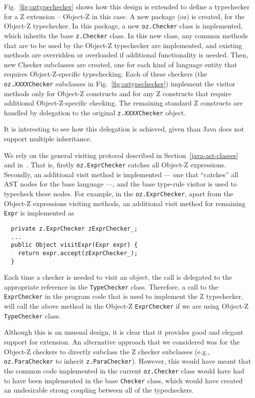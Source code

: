 \documentclass{llncs}
\begin{document}
Fig.~\ref{fig:oztypechecker} shows how this design is extended to
define a typechecker for a Z extension -- Object-Z in this case.  A
new package (oz) is created, for the Object-Z typechecker.  In this
package, a new {\tt oz.Checker} class is implemented, which inherits
the base {\tt z.Checker} class.  In this new class, any common methods
that are to be used by the Object-Z typechecker are implemented, and
existing methods are overridden or overloaded if additional
functionality is needed.  Then, new Checker subclasses are created,
one for each kind of language entity that requires Object-Z-specific
typechecking.  Each of these checkers (the
\texttt{oz.\emph{XXXX}Checker} subclasses in
Fig.~\ref{fig:oztypechecker}) implement the visitor methods only for
Object-Z constructs and for any Z constructs that require additional
Object-Z-specific checking.  The remaining standard Z constructs are
handled by delegation to the original
\texttt{z.\emph{XXXX}Checker} object.

It is interesting to see how this delegation is achieved, given than
Java does not support multiple inheritance.

We rely on the general
visiting protocol described in Section~\ref{java-ast-classes} and
in~\cite{czt}.  That is, firstly {\tt oz.ExprChecker} catches all
Object-Z expressions.  Secondly, an additional visit method is
implemented --- one that ``catches'' all AST nodes for the base
language ---, and the base type-rule visitor is used to typecheck
these nodes.  For example, in the {\tt oz.ExprChecker}, apart from the
Object-Z expressions visiting methods, an additional visit method for
remaining {\tt Expr} is implemented as

\begin{verbatim}
  private z.ExprChecker zExprChecker_;
  ...
  public Object visitExpr(Expr expr) {
    return expr.accept(zExprChecker_);
  }
\end{verbatim}

Each time a checker is needed to visit an object, the call is
delegated to the appropriate reference in the {\tt TypeChecker}
class. Therefore, a call to the {\tt ExprChecker} in the program code
that is used to implement the Z typechecker, will call the above
method in the Object-Z {\tt ExprChecker} if we are using Object-Z {\tt
TypeChecker} class.


Although this is an unusual design, it is clear that it provides good
and elegant support for extension.  An alternative approach that we
considered was for the Object-Z checkers to directly subclass the Z
checker subclasses (e.g., \texttt{oz.ParaChecker} to inherit
\texttt{z.ParaChecker}).  However, this would have meant that the
common code implemented in the current
\texttt{oz.Checker} class would have had to have been
implemented in the base {\tt Checker} class, which would have created
an undesirable strong coupling between all of the typecheckers.
\end{document}
